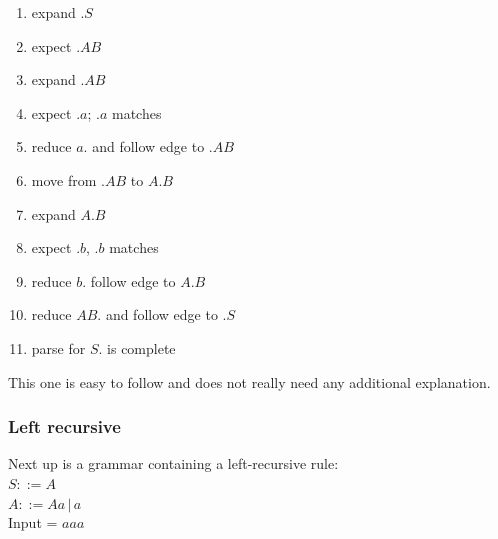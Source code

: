 \documentclass[a4paper,10pt]{article}
\begin{document}
\begin{enumerate}
 \setlength{\itemsep}{0pt}
 \setlength{\parskip}{0pt}
 \setlength{\parsep}{0pt}
 
 \item expand $.S$
 \item expect $.AB$
 \item expand $.AB$
 \item expect $.a$; $.a$ matches
 \item reduce $a.$ and follow edge to $.AB$
 \item move from $.AB$ to $A.B$
 \item expand $A.B$
 \item expect $.b$, $.b$ matches
 \item reduce $b.$ follow edge to $A.B$
 \item reduce $AB.$ and follow edge to $.S$
 \item parse for $S.$ is complete 
\end{enumerate}
This one is easy to follow and does not really need any additional explanation.

\subsubsection{Left recursive}
\label{sec:tracesLeftRecusive}
Next up is a grammar containing a left-recursive rule:\\
$S ::= A$\\
$A ::= Aa\,|\,a$\\
Input = $aaa$
\end{document}
